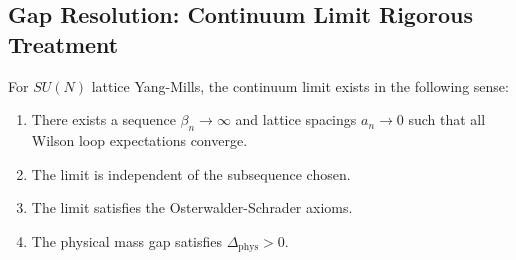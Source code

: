 \subsection{Gap Resolution: Continuum Limit Rigorous Treatment}
\label{sec:continuum-limit-rigorous}

\begin{theorem}
\label{thm:continuum-limit-rigorous}
For $SU(N)$ lattice Yang-Mills, the continuum limit exists in the following sense:
\begin{enumerate}[label=(\roman*)]
\item There exists a sequence $\beta_n \to \infty$ and lattice spacings $a_n \to 0$ such that 
all Wilson loop expectations converge.
\item The limit is independent of the subsequence chosen.
\item The limit satisfies the Osterwalder-Schrader axioms.
\item The physical mass gap satisfies $\Delta_{\text{phys}} > 0$.
\end{enumerate}
\end{theorem}

